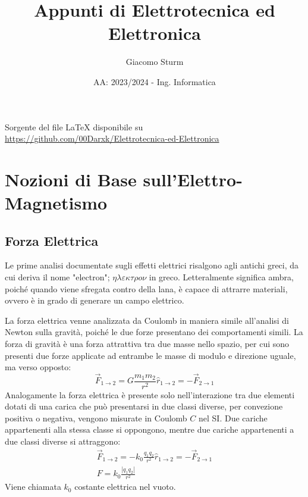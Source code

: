 \documentclass{article}
\renewcommand{\listoffigures}{Lista delle Figure}
\numberwithin{equation}{subsection}
\begin{document}
\title{Appunti di Elettrotecnica ed Elettronica}
\author{Giacomo Sturm}
\date{AA: 2023/2024 - Ing. Informatica}



\pagestyle{fancy}
\fancyhead{}\fancyfoot{}
\fancyfoot[C]{\thepage}

\maketitle

\vspace{10mm}

\begin{center}
    Sorgente del file LaTeX disponibile su \url{https://github.com/00Darxk/Elettrotecnica-ed-Elettronica}
\end{center}

\clearpage

\tableofcontents


\clearpage


\section{Nozioni di Base sull'Elettro-Magnetismo}

\subsection{Forza Elettrica}
Le prime analisi documentate sugli effetti elettrici risalgono agli antichi greci, da cui deriva il nome "electron"; $\eta\lambda\varepsilon\kappa\tau\rho o\nu$ in greco. Letteralmente significa ambra, poiché 
quando viene sfregata contro della lana, è capace di attrarre materiali, ovvero è in grado di generare un campo elettrico.

La forza elettrica venne analizzata da Coulomb in maniera simile all'analisi di Newton sulla gravità, poiché le due forze presentano dei comportamenti simili. La forza di 
gravità è una forza attrattiva tra due masse nello spazio, per cui sono presenti due forze applicate ad entrambe le masse di modulo e direzione uguale, ma verso opposto: 
\begin{equation*}
    \vec{F}_{1\to2}=G\displaystyle\frac{m_1m_2}{r^2}\hat{r}_{1\to2}=-\vec{F}_{2\to1}
\end{equation*}
Analogamente la forza elettrica è presente solo nell'interazione tra due elementi dotati di una carica che può presentarsi in due classi diverse, per convezione 
positiva o negativa, vengono misurate in Coulomb $C$ nel SI. Due cariche appartenenti alla stessa classe si oppongono, mentre due cariche appartenenti a due classi diverse 
si attraggono:
\begin{gather}
    \vec{F}_{1\to2}=-k_0\displaystyle\frac{q_1q_2}{r^2}\hat{r}_{1\to2}=-\vec{F}_{2\to1}\\
    F=k_0\displaystyle\frac{|q_1q_2|}{r^2}
\end{gather} 
Viene chiamata $k_0$ costante elettrica nel vuoto. 
\end{document}

